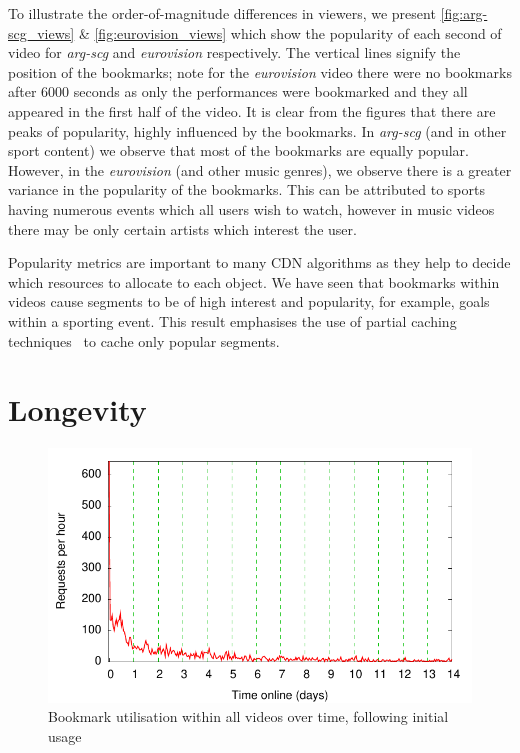 To illustrate the order-of-magnitude differences in viewers, we present \autoref{fig:arg-scg_views} \& \autoref{fig:eurovision_views} which show the popularity of each second of video for \emph{arg-scg} and \emph{eurovision} respectively. The vertical lines signify the position of the bookmarks; note for the \emph{eurovision} video there were no bookmarks after 6000 seconds as only the performances were bookmarked and they all appeared in the first half of the video. It is clear from the figures that there are peaks of popularity, highly influenced by the bookmarks. In \emph{arg-scg} (and in other sport content) we observe that most of the bookmarks are equally popular. However, in the \emph{eurovision} (and other music genres), we observe there is a greater variance in the popularity of the bookmarks. This can be attributed to sports having numerous events which all users wish to watch, however in music videos there may be only certain artists which interest the user.

Popularity metrics are important to many CDN algorithms as they help to decide which resources to allocate to each object. We have seen that bookmarks within videos cause segments to be of high interest and popularity, for example, goals within a sporting event. This result emphasises the use of partial caching techniques~\cite{chen2003aal} to cache only popular segments.

\section{Longevity}
\label{sect:stay_popular}

\begin{figure}[t]
    \centering
    \includegraphics[width=0.5\columnwidth]{./graphs/all_bookpop_lifetime}
    \caption{Bookmark utilisation within all videos over time, following initial usage}
    \label{fig:lifetimes}
\end{figure}


